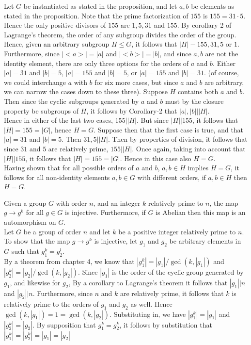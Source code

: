 \documentclass{article}
\begin{document}
 Let $G$ be instantiated as stated in the proposition, and let $a,b$ be elements as stated in the proposition. Note that the prime factorization of $155$ is $155 = 31\cdot5$. Hence the only positive divisors of $155$ are $1,5,31$ and $155$. By corollary 2 of Lagrange's theorem, the order of any subgroup divides the order of the group. Hence, given an arbitrary subgroup $H\le G$, it follows that $|H| - 155,31,5$ or $1$. Furthermore, since $|<a>| = |a|$ and $|<b>| = |b|$, and since $a,b$ are not the identity element, there are only three options for the orders of $a$ and $b$. Either $|a| = 31$ and $|b| = 5$, $|a| = 155$ and $|b| = 5$, or $|a| = 155$ and $|b| = 31$. (of course, we could interchange $a$ with $b$ for six more cases, but since $a$ and $b$ are arbitrary, we can narrow the cases down to these three). Suppose $H$ contains both $a$ and $b$. Then since the cyclic subgroups generated by $a$ and $b$ must by the closure property be subgroups of $H$, it follows by Corollary-2 that $|a|,|b| | |H|$.\\
Hence in either of the last two cases, $155| |H|$. But since $|H| | 155$, it follows that $|H| = 155 = |G|$, hence $H = G$. Suppose then that the first case is true, and that $|a| = 31$ and $|b| = 5$. Then $31,5||H|$. Then by properties of division, it follows that since $31$ and $5$ are relatively prime, $155 ||H|$. Once again, taking into account that $|H| | 155$, it follows that $|H| = 155 = |G|$. Hence in this case also $H = G$.\\

Having shown that for all possible orders of $a$ and $b$, $a,b\in H$ implies $H = G$, it follows for all non-identity elements $a,b\in G$ with different orders, if $a,b\in H$ then $H = G$. \\

\newpage

 Given a group $G$ with order $n$, and an integer $k$ relatively prime to $n$, the map $g\rightarrow g^k$ for all $g\in G$ is injective. Furthermore, if $G$ is Abelian then this map is an automorphism on $G$. \\

 Let $G$ be a group of order $n$ and let $k$ be a positive integer relatively prime to $n$. To show that the map $g\rightarrow g^k$ is injective, let $g_1$ and $g_2$ be arbitrary elements in $G$ such that $g_1^k = g_2^l$. \\

By a theorem from chapter 4, we know that $|g_1^k| = |g_1|/\gcd(k,|g_1|)$ and $|g_2^k| = |g_2|/\gcd(k,|g_2|).$ Since $|g_1|$ is the order of the cyclic group generated by $g_1$, and likewise for $g_2$, By a corollary to Lagrange's theorem it follows that $|g_1|\big | n$ and $|g_2| \big | n $. Furthermore, since $n$ and $k$ are relatively prime, it follows that $k$ is relatively prime to the orders of $g_1$ and $g_2$ as well. Hence $\gcd(k,|g_1|) = 1 = \gcd(k,|g_2|)$. Substituting in, we have $|g_1^k| = |g_1|$ and $|g_2^k| = |g_2|$. By supposition that $g_1^k = g_2^k$, it follows by substitution that $|g_1^k| = |g_2^k| = |g_1| = |g_2|$\\
\end{document}
